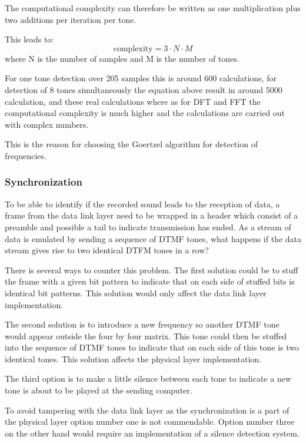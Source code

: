 		The computational complexity can therefore be written as one multiplication plus two additions per iteration per tone.

		This leads to:
		\begin{equation}\mathrm{complexity} = 3\cdot N\cdot M\end{equation}
		where N is the number of samples and M is the number of tones.
		
		For one tone detection over 205 samples this is around 600 calculations, for detection of 8 tones simultaneously the equation
		above result in around 5000 calculation, and these real calculations where as for DFT and FFT the computational complexity 
		is much higher and the calculations are carried out with complex numbers.
		
		This is the reason for choosing the Goertzel algorithm for detection of frequencies.
		
		\subsubsection{Synchronization}
		To be able to identify if the recorded sound leads to the reception of data, a frame from the data link
		layer need to be wrapped in a header which consist of a preamble and possible a tail to indicate transmission has ended.
		As a stream of data is emulated by sending a sequence of DTMF tones, what happens if the data stream gives rise to two identical
		DTFM tones in a row?
		
		There is several ways to counter this problem. The first solution could be to stuff the frame with a given bit
		pattern to indicate that on each side of stuffed bits is identical bit patterns. This solution would only affect the data 
		link layer implementation.
		
		The second solution is to introduce a new frequency so another DTMF tone would appear outside the four by four matrix.
		This tone could then be stuffed into the sequence of DTMF tones to indicate that on each side of this tone is two identical
		tones. This solution affects the physical layer implementation.
		
		The third option is to make a little silence between each tone to indicate a new tone is about to be played at the sending computer.
		
		To avoid tampering with the data link layer as the synchronization is a part of the physical layer option number one is not commendable. Option
		number three on the other hand would require an implementation of a silence detection system.
		

